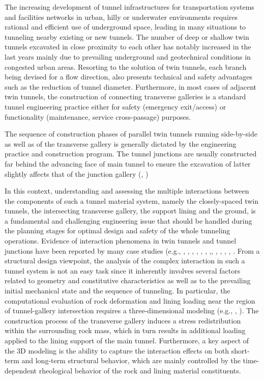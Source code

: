 \documentclass[Journal,letterpaper, NoLists,SectionNumbers]{ascelike-new}
\begin{document}
The increasing development of tunnel infrastructures for transportation systems and facilities networks in urban, hilly or underwater environments requires rational and efficient use of underground space, leading in many situations to tunneling nearby existing or new tunnels. The number of deep or shallow twin tunnels excavated in close proximity to each other has notably increased in the last years mainly due to prevailing underground and geotechnical conditions in congested urban areas. Resorting to the solution of twin tunnels, each branch being devised for a flow direction, also presents technical and safety advantages such as the reduction of tunnel diameter. Furthermore, in most cases of adjacent twin tunnels, the construction of connecting transverse galleries is a standard tunnel engineering practice either for safety (emergency exit/access) or functionality (maintenance, service cross-passage) purposes.

The sequence of construction phases of parallel twin tunnels running side-by-side as well as of the transverse gallery is generally dictated by the engineering practice and construction program. The tunnel junctions are usually constructed far behind the advancing face of main tunnel to ensure the excavation of latter slightly affects that of the junction gallery (, )

In this context, understanding and assessing the multiple interactions between the components of such a tunnel material system, namely the closely-spaced twin tunnels, the intersecting transverse gallery, the support lining and the ground, is a fundamental and challenging engineering issue that should be handled during the planning stages for optimal design and safety of the whole tunneling operations. Evidence of interaction phenomena in twin tunnels and tunnel junctions have been reported by many case studies (e.g., , , , , , , ,, , , , , . From a structural design viewpoint, the analysis of the complex interaction in such a tunnel system is not an easy task since it inherently involves several factors related to geometry and constitutive characteristics as well as to the prevailing initial mechanical state and the sequence of tunneling. In particular, the computational evaluation of rock deformation and lining loading near the region of tunnel-gallery intersection requires a three-dimensional modeling (e.g., , ). The construction process of the transverse gallery induces a stress redistribution within the surrounding rock mass, which in turn results in additional loading applied to the lining support of the main tunnel. Furthermore, a key aspect of the 3D modeling is the ability to capture the interaction effects on both short-term and long-term structural behavior, which are mainly controlled by the time-dependent rheological behavior of the rock and lining material constituents.
\end{document}
